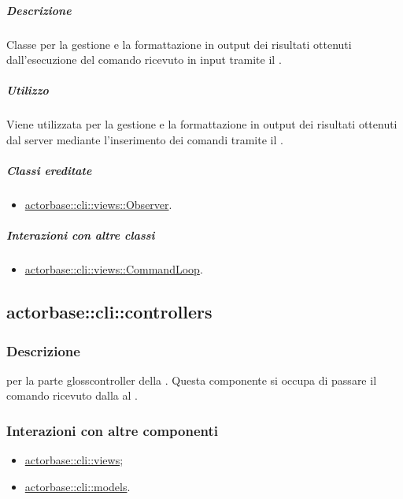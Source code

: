 \documentclass{scalatekids-article}
\begin{document}
\subparagraph{Descrizione}

Classe per la gestione e la formattazione in output dei risultati ottenuti
dall'esecuzione del comando ricevuto in input tramite il  .

\subparagraph{Utilizzo}

Viene utilizzata per la gestione e la formattazione in output dei risultati
ottenuti dal server mediante l'inserimento dei comandi tramite il
 .

\subparagraph{Classi ereditate}

\begin{itemize}
\item \hyperref[sec:actorbase::cli::views::Observer]{actorbase::cli::views::Observer}.
\end{itemize}

\subparagraph{Interazioni con altre classi}

\begin{itemize}
\item \hyperref[sec:actorbase::cli::views::CommandLoop]{actorbase::cli::views::CommandLoop}.
\end{itemize}

\subsection{actorbase::cli::controllers}
\label{sec:actorbase::cli::controllers}

\subsubsection{Descrizione}

 per la parte gloss{controller} della . Questa
componente si occupa di passare il comando ricevuto dalla  al
.

\subsubsection{Interazioni con altre componenti}

\begin{itemize}
\item \hyperref[sec:actorbase::cli::views]{actorbase::cli::views};
\item \hyperref[sec:actorbase::cli::models]{actorbase::cli::models}.
\end{itemize}
\end{document}
